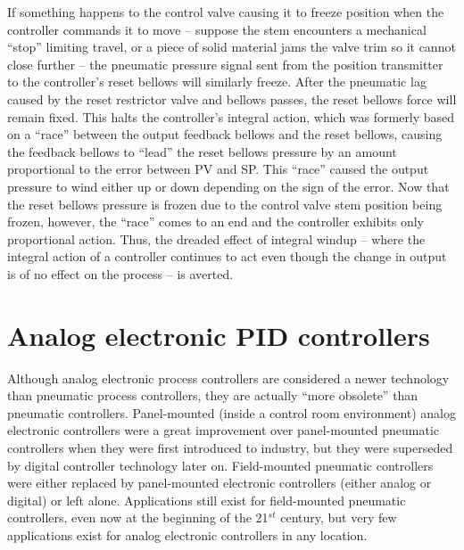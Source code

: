 If something happens to the control valve causing it to freeze position when the controller commands it to move -- suppose the stem encounters a mechanical ``stop'' limiting travel, or a piece of solid material jams the valve trim so it cannot close further -- the pneumatic pressure signal sent from the position transmitter to the controller's reset bellows will similarly freeze.  After the pneumatic lag caused by the reset restrictor valve and bellows passes, the reset bellows force will remain fixed.  This halts the controller's integral action, which was formerly based on a ``race'' between the output feedback bellows and the reset bellows, causing the feedback bellows to ``lead'' the reset bellows pressure by an amount proportional to the error between PV and SP.  This ``race'' caused the output pressure to wind either up or down depending on the sign of the error.  Now that the reset bellows pressure is frozen due to the control valve stem position being frozen, however, the ``race'' comes to an end and the controller exhibits only proportional action.  Thus, the dreaded effect of integral windup -- where the integral action of a controller continues to act even though the change in output is of no effect on the process -- is averted.











\filbreak
\section{Analog electronic PID controllers}

Although analog electronic process controllers are considered a newer technology than pneumatic process controllers, they are actually ``more obsolete'' than pneumatic controllers.  Panel-mounted (inside a control room environment) analog electronic controllers were a great improvement over panel-mounted pneumatic controllers when they were first introduced to industry, but they were superseded by digital controller technology later on.  Field-mounted pneumatic controllers were either replaced by panel-mounted electronic controllers (either analog or digital) or left alone.  Applications still exist for field-mounted pneumatic controllers, even now at the beginning of the 21$^{st}$ century, but very few applications exist for analog electronic controllers in any location.

